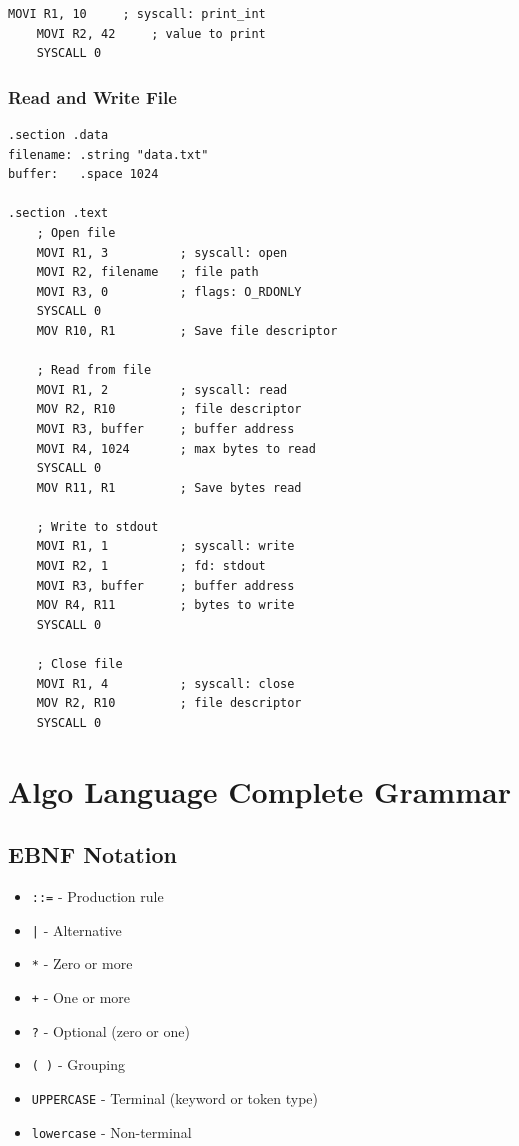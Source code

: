 \documentclass[12pt,a4paper,oneside]{book}
\newcommand{\code}[1]{\texttt{#1}}
\begin{document}
\begin{lstlisting}[style=assembly]
    MOVI R1, 10     ; syscall: print_int
    MOVI R2, 42     ; value to print
    SYSCALL 0
\end{lstlisting}

\subsection{Read and Write File}

\begin{lstlisting}[style=assembly]
.section .data
filename: .string "data.txt"
buffer:   .space 1024

.section .text
    ; Open file
    MOVI R1, 3          ; syscall: open
    MOVI R2, filename   ; file path
    MOVI R3, 0          ; flags: O_RDONLY
    SYSCALL 0
    MOV R10, R1         ; Save file descriptor
    
    ; Read from file
    MOVI R1, 2          ; syscall: read
    MOV R2, R10         ; file descriptor
    MOVI R3, buffer     ; buffer address
    MOVI R4, 1024       ; max bytes to read
    SYSCALL 0
    MOV R11, R1         ; Save bytes read
    
    ; Write to stdout
    MOVI R1, 1          ; syscall: write
    MOVI R2, 1          ; fd: stdout
    MOVI R3, buffer     ; buffer address
    MOV R4, R11         ; bytes to write
    SYSCALL 0
    
    ; Close file
    MOVI R1, 4          ; syscall: close
    MOV R2, R10         ; file descriptor
    SYSCALL 0
\end{lstlisting}

\chapter{Algo Language Complete Grammar}

\section{EBNF Notation}

\begin{itemize}
    \item \code{::=} - Production rule
    \item \code{|} - Alternative
    \item \code{*} - Zero or more
    \item \code{+} - One or more
    \item \code{?} - Optional (zero or one)
    \item \code{( )} - Grouping
    \item \code{UPPERCASE} - Terminal (keyword or token type)
    \item \code{lowercase} - Non-terminal
\end{itemize}
\end{document}
